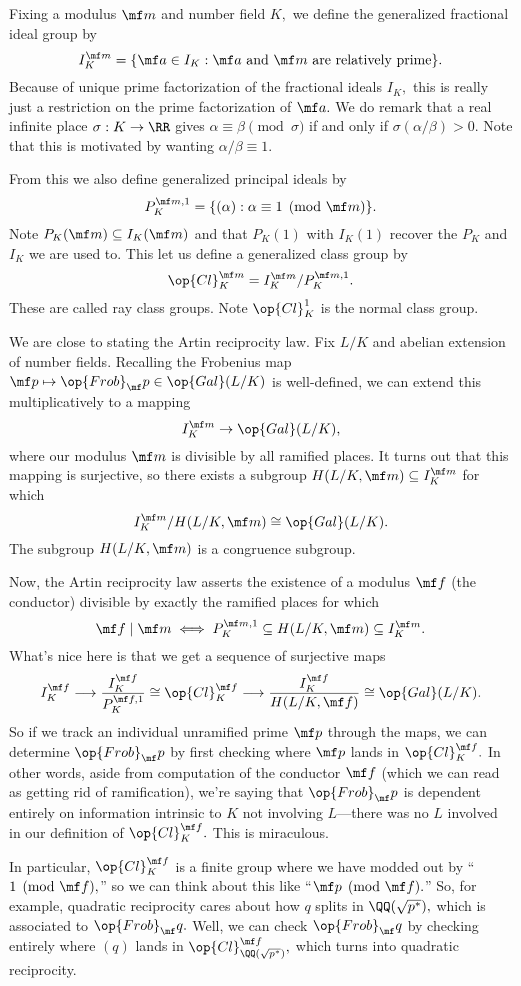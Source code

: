 Fixing a modulus $\mf m$ and number field $K,$ we define the generalized fractional ideal group by
\[I_K^{\mf m}=\{\mf a\in I_K:\mf a\text{ and }\mf m\text{ are relatively prime}\}.\]
Because of unique prime factorization of the fractional ideals $I_K,$ this is really just a restriction on the prime factorization of $\mf a.$ We do remark that a real infinite place $\sigma:K\to\RR$ gives $\alpha\equiv\beta\pmod\sigma$ if and only if $\sigma(\alpha/\beta)>0.$ Note that this is motivated by wanting $\alpha/\beta\equiv1.$

From this we also define generalized principal ideals by
\[P_K^{\mf m,1}=\{(\alpha):\alpha\equiv1\pmod{\mf m}\}.\]
Note $P_K(\mf m)\subseteq I_K(\mf m)$ and that $P_K(1)$ with $I_K(1)$ recover the $P_K$ and $I_K$ we are used to. This let us define a generalized class group by
\[\op{Cl}_K^{\mf m}=I_K^{\mf m}/P_K^{\mf m,1}.\]
These are called ray class groups. Note $\op{Cl}_K^1$ is the normal class group.

We are close to stating the Artin reciprocity law. Fix $L/K$ and abelian extension of number fields. Recalling the Frobenius map $\mf p\mapsto\op{Frob}_\mf p\in\op{Gal}(L/K)$ is well-defined, we can extend this multiplicatively to a mapping
\[I_K^{\mf m}\to\op{Gal}(L/K),\]
where our modulus $\mf m$ is divisible by all ramified places. It turns out that this mapping is surjective, so there exists a subgroup $H(L/K,\mf m)\subseteq I_K^{\mf m}$ for which
\[I_K^{\mf m}/H(L/K,\mf m)\cong\op{Gal}(L/K).\]
The subgroup $H(L/K,\mf m)$ is a congruence subgroup.

Now, the Artin reciprocity law asserts the existence of a modulus $\mf f$ (the conductor) divisible by exactly the ramified places for which
\[\mf f\mid\mf m\iff P_K^{\mf m,1}\subseteq H(L/K,\mf m)\subseteq I_K^{\mf m}.\]
What's nice here is that we get a sequence of surjective maps
\[I_K^{\mf f}\longrightarrow\frac{I_K^{\mf f}}{P_K^{\mf f,1}}\cong\op{Cl}_K^{\mf f}\longrightarrow\frac{I_K^{\mf f}}{H(L/K,\mf f)}\cong\op{Gal}(L/K).\]
So if we track an individual unramified prime $\mf p$ through the maps, we can determine $\op{Frob}_\mf p$ by first checking where $\mf p$ lands in $\op{Cl}_K^{\mf f}.$ In other words, aside from computation of the conductor $\mf f$ (which we can read as getting rid of ramification), we're saying that $\op{Frob}_\mf p$ is dependent entirely on information intrinsic to $K$ not involving $L$---there was no $L$ involved in our definition of $\op{Cl}_K^{\mf f}.$ This is miraculous.

In particular, $\op{Cl}_K^{\mf f}$ is a finite group where we have modded out by ``$1\pmod{\mf f},$'' so we can think about this like ``$\mf p\pmod{\mf f}.$'' So, for example, quadratic reciprocity cares about how $q$ splits in $\QQ(\sqrt{p^*}),$ which is associated to $\op{Frob}_\mf q.$ Well, we can check $\op{Frob}_\mf q$ by checking entirely where $(q)$ lands in $\op{Cl}_{\QQ(\sqrt{p^*})}^{\mf f},$ which turns into quadratic reciprocity.

